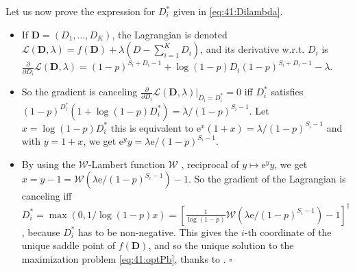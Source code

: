 Let us now prove the expression for $D_i^*$ given in \eqref{eq:41:Dilambda}.
\begin{itemize}
	\item
	If $\boldsymbol{D} = (D_1,\dots,D_{K})$,
    the Lagrangian is denoted $\mathcal{L}(\boldsymbol{D}, \lambda) = f(\boldsymbol{D}) + \lambda(D - \sum_{i=1}^{K} D_i)$, and its derivative w.r.t. $D_i$ is
    $\frac{\partial}{\partial D_i} \mathcal{L}(\boldsymbol{D}, \lambda) = (1-p)^{S_i + D_i - 1} + \log(1 - p) D_i (1-p)^{S_i + D_i - 1} - \lambda$.

    \item
    So the gradient is canceling $\frac{\partial}{\partial D_i} \mathcal{L}(\boldsymbol{D}, \lambda) |_{D_i=D_i^*} = 0$
    iff $D_i^*$ satisfies $(1-p)^{D_i^*}( 1 + \log(1-p) D_i^*) = \lambda / (1-p)^{S_i - 1}$. Let $x = \log(1-p) D_i^*$ this is equivalent to $\mathrm{e}^{x}(1 + x) = \lambda / (1-p)^{S_i - 1}$
    and with $y = 1 + x$, we get $\mathrm{e}^{y}y = \lambda\mathrm{e} / (1-p)^{S_i - 1}$.

	\item
    By using the $\mathcal{W}$-Lambert function $\mathcal{W}$ \cite{Corless96}, reciprocal of $y \mapsto \mathrm{e}^{y}y$, we get $x = y - 1 = \mathcal{W}(\lambda\mathrm{e} / (1-p)^{S_i - 1}) - 1$.
    So the gradient of the Lagrangian is canceling iff $D_i^* = \max(0, 1/\log(1-p) x) = \left[ \frac{1}{\log(1-p)}\mathcal{W}(\lambda\mathrm{e} / (1-p)^{S_i - 1}) - 1\right]^{\dagger}$, because $D_i^*$ has to be non-negative.
    This gives the $i$-th coordinate of the unique saddle point of $f(\boldsymbol{D})$,
    and so the unique solution to the maximization problem \eqref{eq:41:optPb}, thanks to \cite[Theorem 1]{Luenberger68}.
    \hfill{}$\square$
\end{itemize}

